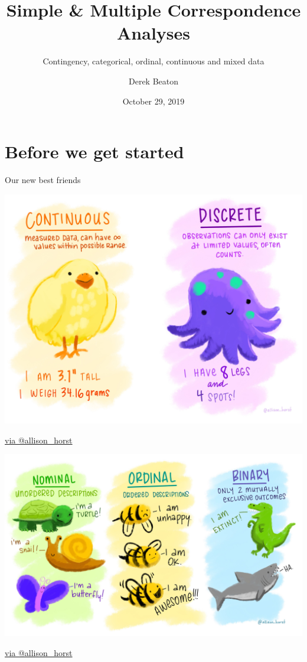 \documentclass[
  ignorenonframetext,
]{beamer}
\title{Simple \& Multiple Correspondence Analyses}
\subtitle{Contingency, categorical, ordinal, continuous and mixed data}
\author{Derek Beaton}
\date{October 29, 2019}
\institute{Rotman Research Institute}
\begin{document}
\frame{\titlepage}

\hypertarget{before-we-get-started}{%
\section{Before we get started}\label{before-we-get-started}}

\begin{frame}{Our new best friends}
\protect\hypertarget{our-new-best-friends}{}

\includegraphics[width=\textwidth,height=0.75\textheight]{../images/cont_disc.jpg}

\href{https://twitter.com/allison_horst}{via @allison\_horst}

\end{frame}

\begin{frame}

\includegraphics[width=\textwidth,height=0.75\textheight]{../images/nom_ord_bin.jpg}

\href{https://twitter.com/allison_horst}{via @allison\_horst}

\end{frame}
\end{document}
